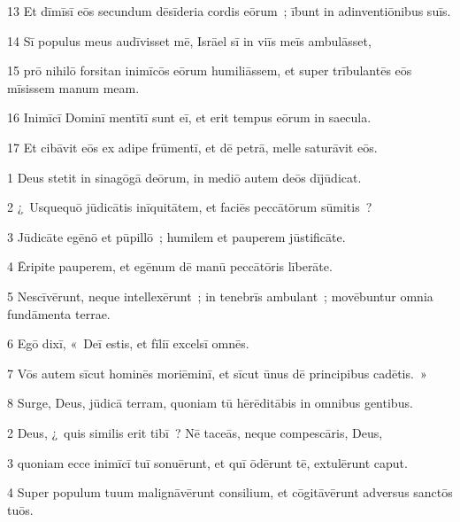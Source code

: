 \psalmVerse
  {\phantom{0}13}
  {Et dīmīsī eōs secundum dēsīderia cordis eōrum~; ībunt in adinventiōnibus suīs.}


\psalmVerse
  {\phantom{0}14}
  {Sī populus meus audīvisset mē, Isrāel sī in viīs meīs ambulāsset,}


\psalmVerse
  {\phantom{0}15}
  {prō nihilō forsitan inimīcōs eōrum humiliāssem, et super trībulantēs eōs mīsissem manum meam.}


\psalmVerse
  {\phantom{0}16}
  {Inimīcī Dominī mentītī sunt eī, et erit tempus eōrum in saecula.}


\psalmVerse
  {\phantom{0}17}
  {Et cibāvit eōs ex adipe frūmentī, et dē petrā, melle saturāvit eōs.}




\psalmVerse
  {\phantom{00}1}
  {Deus stetit in sinagōgā deōrum, in mediō autem deōs dījūdicat.}


\psalmVerse
  {\phantom{00}2}
  {¿~Usquequō jūdicātis inīquitātem, et faciēs peccātōrum sūmitis~?}


\psalmVerse
  {\phantom{00}3}
  {Jūdicāte egēnō et pūpillō~; humilem et pauperem jūstificāte.}


\psalmVerse
  {\phantom{00}4}
  {Ēripite pauperem, et egēnum dē manū peccātōris līberāte.}


\psalmVerse
  {\phantom{00}5}
  {Nescīvērunt, neque intellexērunt~; in tenebrīs ambulant~; movēbuntur omnia fundāmenta terrae.}


\psalmVerse
  {\phantom{00}6}
  {Egō dixī, «~Deī estis, et fīliī excelsī omnēs.}


\psalmVerse
  {\phantom{00}7}
  {Vōs autem sīcut hominēs moriēminī, et sīcut ūnus dē principibus cadētis.~»}


\psalmVerse
  {\phantom{00}8}
  {Surge, Deus, jūdicā terram, quoniam tū hērēditābis in omnibus gentibus.}



\psalmVerse
  {\phantom{00}2}
  {Deus, ¿~quis similis erit tibī~? Nē taceās, neque compescāris, Deus,}


\psalmVerse
  {\phantom{00}3}
  {quoniam ecce inimīcī tuī sonuērunt, et quī ōdērunt tē, extulērunt caput.}


\psalmVerse
  {\phantom{00}4}
  {Super populum tuum malignāvērunt consilium, et cōgitāvērunt adversus sanctōs tuōs.}


